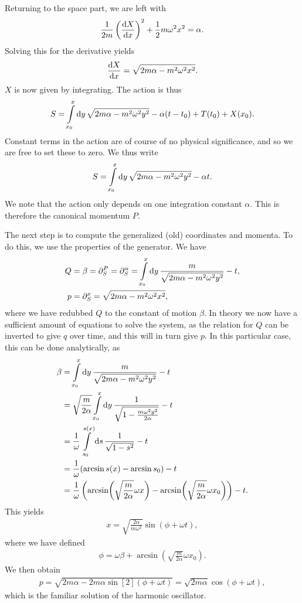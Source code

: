 Returning to the space part, we are left with
\begin{align*}
	\frac{1}{2m}\left(\dv{X}{x}\right)^{2} + \frac{1}{2}m\omega^{2}x^{2} = \alpha.
\end{align*}
Solving this for the derivative yields
\begin{align*}
	\dv{X}{x} = \sqrt{2m\alpha - m^{2}\omega^{2}x^{2}}.
\end{align*}
$X$ is now given by integrating. The action is thus
\begin{align*}
	S = \int\limits_{x_{0}}^{x}\dd{y}{\sqrt{2m\alpha - m^{2}\omega^{2}y^{2}}} - \alpha(t - t_{0}) + T(t_{0}) + X(x_{0}).
\end{align*}
Constant terms in the action are of course of no physical significance, and so we are free to set these to zero. We thus write
\begin{align*}
	S = \int\limits_{x_{0}}^{x}\dd{y}{\sqrt{2m\alpha - m^{2}\omega^{2}y^{2}}} - \alpha t.
\end{align*}
We note that the action only depends on one integration constant $\alpha$. This is therefore the canonical momentum $P$.

The next step is to compute the generalized (old) coordinates and momenta. To do this, we use the properties of the generator. We have
\begin{align*}
	Q &= \beta = \partial^{P}_{S} = \partial^{\alpha}_{S} = \int\limits_{x_{0}}^{x}\dd{y}{\frac{m}{\sqrt{2m\alpha - m^{2}\omega^{2}y^{2}}}} - t, \\
	p &= \partial^{x}_{S} = \sqrt{2m\alpha - m^{2}\omega^{2}x^{2}},
\end{align*}
where we have redubbed $Q$ to the constant of motion $\beta$. In theory we now have a sufficient amount of equations to solve the system, as the relation for $Q$ can be inverted to give $q$ over time, and this will in turn give $p$. In this particular case, this can be done analytically, as
\begin{align*}
	\beta &= \int\limits_{x_{0}}^{x}\dd{y}{\frac{m}{\sqrt{2m\alpha - m^{2}\omega^{2}y^{2}}}} - t \\
	      &= \sqrt{\frac{m}{2\alpha}}\int\limits_{x_{0}}^{x}\dd{y}{\frac{1}{\sqrt{1 - \frac{m\omega^{2}y^{2}}{2\alpha}}}} - t \\
	      &= \frac{1}{\omega}\int\limits_{s_{0}}^{s(x)}\dd{s}{\frac{1}{\sqrt{1 - s^{2}}}} - t \\
	      &= \frac{1}{\omega}(\arcsin{s(x)} - \arcsin{s_{0}}) - t \\
	      &= \frac{1}{\omega}\left(\arcsin(\sqrt{\frac{m}{2\alpha}}\omega x) - \arcsin(\sqrt{\frac{m}{2\alpha}}\omega x_{0})\right) - t.
\end{align*}
This yields
\begin{align*}
	x = \sqrt{\frac{2\alpha}{m\omega^{2}}}\sin(\phi + \omega t),
\end{align*}
where we have defined
\begin{align*}
	\phi = \omega\beta + \arcsin(\sqrt{\frac{m}{2\alpha}}\omega x_{0}).
\end{align*}
We then obtain
\begin{align*}
	p = \sqrt{2m\alpha - 2m\alpha\sin[2](\phi + \omega t)} = \sqrt{2m\alpha}\cos(\phi + \omega t),
\end{align*}
which is the familiar solution of the harmonic oscillator.

